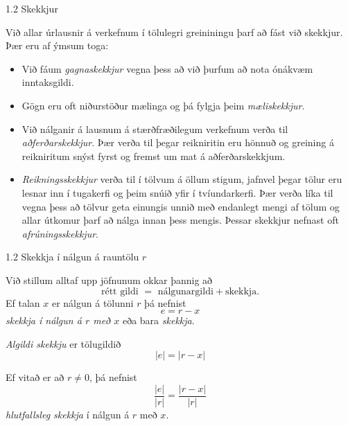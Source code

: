 %
\begin{frame}{ 1.2 Skekkjur} 

Við allar úrlausnir á verkefnum í tölulegri greininingu 
þarf  að fást við skekkjur. \pause 
Þær eru af ýmsum toga: \pause


\begin{itemize} 
\item Við fáum {\it gagnaskekkjur} vegna þess
að við þurfum að nota ónákvæm  inntaksgildi. \pause
\item Gögn eru oft niðurstöður
mælinga og þá fylgja þeim {\it mæliskekkjur}.\pause
\item Við nálganir á lausnum á
stærðfræðilegum verkefnum verða til {\it aðferðarskekkjur}.
Þær verða til þegar reikniritin eru hönnuð og
greining á reikniritum snýst fyrst og fremst um mat á 
aðferðarskekkjum.\pause
\item  {\it Reikningsskekkjur} verða til í tölvum á öllum
stigum, jafnvel þegar tölur eru lesnar inn í tugakerfi og þeim snúið
yfir í tvíundarkerfi. Þær verða líka til vegna þess að tölvur geta
einungis unnið með endanlegt mengi af tölum og allar útkomur þarf að
nálga innan þess mengis.  Þessar skekkjur nefnast oft {\it
  afrúningsskekkjur}.  
\end{itemize} 
\end{frame}
%
%
\begin{frame}{1.2 Skekkja í nálgun á rauntölu $r$} 

Við stillum alltaf upp jöfnunum okkar þannig að 
\begin{equation*}
	\text{rétt gildi } = \text{ nálgunargildi} + 
	\text{skekkja}.
\end{equation*} \pause
Ef talan $x$ er nálgun á tölunni  $r$ þá nefnist 
\begin{equation*}
	e=r-x 
\end{equation*}
{\it skekkja í nálgun á $r$ með $x$} eða bara {\it skekkja}.
\pause

{\it Algildi skekkju} er tölugildið 
\begin{equation*}
	|e|=|r-x|
\end{equation*}
\pause

Ef vitað er að $r\neq 0$, þá nefnist 
\begin{equation*}
	\dfrac{|e|}{|r|}=\dfrac{|r-x|}{|r|}
\end{equation*}
{\it hlutfallsleg skekkja} í nálgun á $r$ með $x$.
\end{frame}
%

